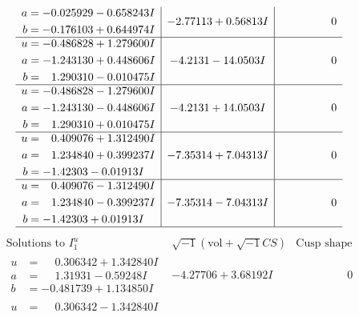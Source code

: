 \documentclass[1p]{elsarticle_modified}
\theoremstyle{definition}
\newcommand{\I}{\sqrt{-1}}
\begin{document}
$$\begin{array}{c|c|c}
\begin{aligned}
a &= -0.025929 - 0.658243 I \\
b &= -0.176103 + 0.644974 I\end{aligned}
 & -2.77113 + 0.56813 I & \phantom{-0.000000 } 0 \\ \hline\begin{aligned}
u &= -0.486828 + 1.279600 I \\
a &= -1.243130 + 0.448606 I \\
b &= \phantom{-}1.290310 - 0.010475 I\end{aligned}
 & -4.2131 - 14.0503 I & \phantom{-0.000000 } 0 \\ \hline\begin{aligned}
u &= -0.486828 - 1.279600 I \\
a &= -1.243130 - 0.448606 I \\
b &= \phantom{-}1.290310 + 0.010475 I\end{aligned}
 & -4.2131 + 14.0503 I & \phantom{-0.000000 } 0 \\ \hline\begin{aligned}
u &= \phantom{-}0.409076 + 1.312490 I \\
a &= \phantom{-}1.234840 + 0.399237 I \\
b &= -1.42303 - 0.01913 I\end{aligned}
 & -7.35314 + 7.04313 I & \phantom{-0.000000 } 0 \\ \hline\begin{aligned}
u &= \phantom{-}0.409076 - 1.312490 I \\
a &= \phantom{-}1.234840 - 0.399237 I \\
b &= -1.42303 + 0.01913 I\end{aligned}
 & -7.35314 - 7.04313 I & \phantom{-0.000000 } 0\\
 \hline 
 \end{array}$$\newpage$$\begin{array}{c|c|c}  
\text{Solutions to }I^u_{1}& \I (\text{vol} + \sqrt{-1}CS) & \text{Cusp shape}\\
 \hline 
\begin{aligned}
u &= \phantom{-}0.306342 + 1.342840 I \\
a &= \phantom{-}1.31931 - 0.59248 I \\
b &= -0.481739 + 1.134850 I\end{aligned}
 & -4.27706 + 3.68192 I & \phantom{-0.000000 } 0 \\ \hline\begin{aligned}
u &= \phantom{-}0.306342 - 1.342840 I \\

\end{aligned}
\end{array}$$
\end{document}
